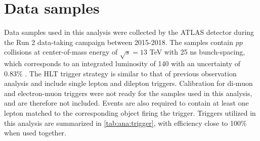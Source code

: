 \documentclass[../thesis.tex]{subfiles}
\begin{document}
\vspace{-1\baselineskip}

\section{Data samples}
\label{sec:data}
Data samples used in this analysis were collected by the \acs{ATLAS} detector during the Run 2 data-taking campaign between 2015-2018. The samples contain $pp$ collisions at center-of-mass energy of $\sqrt{s}=13$ TeV with 25 ns bunch-spacing, which corresponds to an integrated luminosity of 140 \fb with an uncertainty of 0.83\% \citep{DAPR-2021-01}. The \acs{HLT} trigger strategy is similar to that of previous \tttt observation analysis \citep{tttt_obs} and include single lepton and dilepton triggers. Calibration for di-muon and electron-muon triggers were not ready for the samples used in this analysis, and are therefore not included. Events are also required to contain at least one lepton matched to the corresponding object firing the trigger. Triggers utilized in this analysis are summarized in \autoref{tab:ana:trigger}, with efficiency close to 100\% when used together.
\end{document}
